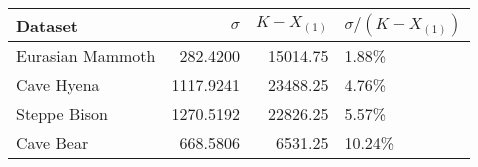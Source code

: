 
\begin{tabular}{lrrl}
\toprule
Dataset & $\sigma$ & $K - X_{(1)}$ & $\sigma/(K - X_{(1)})$\\
\midrule
Eurasian Mammoth & 282.4200 & 15014.75 & 1.88\%\\
Cave Hyena & 1117.9241 & 23488.25 & 4.76\%\\
Steppe Bison & 1270.5192 & 22826.25 & 5.57\%\\
Cave Bear & 668.5806 & 6531.25 & 10.24\%\\
\bottomrule
\end{tabular}
